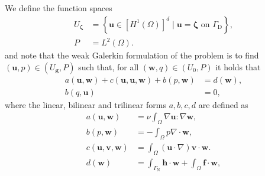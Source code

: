 \documentclass[onecolumn, twoside, a4paper, 11pt]{article}
\begin{document}
We define the function spaces
\begin{align}
  U_{\bm{\zeta}} &= \left\{ \bm u \in [H^1(\Omega)]^d \;|\; \bm u = \bm \zeta \text{ on } \Gamma_\text{D} \right\}, \\
  P &= L^2(\Omega).
\end{align}
%
and note that the weak Galerkin formulation of the problem is to find
%
$(\bm u, p) \in (U_{\bm g}, P)$ such that, for all $(\bm w, q) \in (U_0, P)$ it holds
that
\begin{align}
  a(\bm u, \bm w) + c(\bm u, \bm u, \bm w) + b(p, \bm w) &= d(\bm w), \label{eqn:var-1} \\
  b(q, \bm u) &= 0, \label{eqn:var-2}
\end{align}
%
where the linear, bilinear and trilinear forms $a,b,c,d$ are defined as
%
\begin{subequations}
\begin{align}
  a(\bm u, \bm w) &= \nu \int_\Omega \nabla \bm u : \nabla \bm w, \label{eqn:form-3} \\
  b(p, \bm w) &= -\int_\Omega p \nabla \cdot \bm w, \label{eqn:form-2} \\
  c(\bm u, \bm v, \bm w) &= \int_\Omega (\bm u \cdot \nabla) \bm v \cdot \bm w. \label{eqn:form-4}\\
  d(\bm w) &= \int_{\Gamma_\text{N}} \bm h \cdot \bm w + \int_{\Omega} \bm f \cdot \bm w, \label{eqn:form-1}
\end{align}
\end{subequations}
\end{document}
